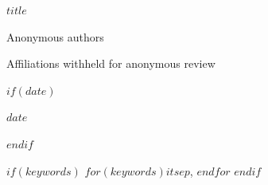 

\def\spacingset#1{\renewcommand{\baselinestretch}{#1}\small\normalsize}
\spacingset{1}

\begin{titlepage}
\thispagestyle{empty}
\vspace*{0.55in}

\begin{center}
  {\LARGE\bfseries $title$\par}
  \vspace{0.9cm}
  {\large Anonymous authors\par}
  \vspace{0.18cm}
  {\normalsize Affiliations withheld for anonymous review\par}
$if(date)$
  \vspace{0.45cm}
  {\normalsize $date$\par}
$endif$
\end{center}

\vspace{0.55in}
\begin{abstract}
$abstract$
\end{abstract}

$if(keywords)$
 $for(keywords)$$it$$sep$, $endfor$
$endif$

\vfill
\end{titlepage}

\setcounter{page}{1}
\spacingset{1}

